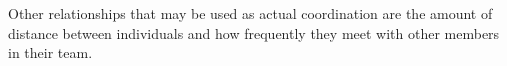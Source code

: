 Other relationships that may be used as actual coordination are the amount of distance between individuals and how frequently they meet with other members in their team.






